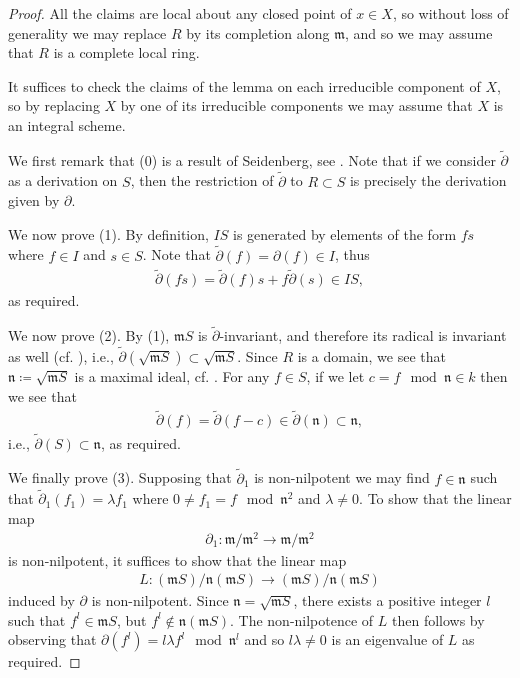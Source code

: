 \documentclass[12pt, a4paper]{amsart}
\theoremstyle{definition}
\theoremstyle{named}
\begin{document}
\begin{proof}
All the claims are local about any closed point of $x \in X$, so without loss of generality we may replace $R$ by its completion along $\mathfrak m$, and so we may assume that $R$ is a complete local ring.



It suffices to check the  claims of the lemma on each irreducible component of $X$, so by replacing $X$ by one of its irreducible components we may assume that $X$ is an integral scheme. 

We first remark that (0) is a result of Seidenberg, see \cite{MR188247}.  Note that 
if we consider $\tilde{\partial}$ as a derivation on $S$, then the restriction of $\tilde{\partial}$
to $R \subset S$
is precisely the derivation given by $\partial$.

We now prove (1). By definition, $IS$ is generated by elements of the form 
$fs$ where $f \in I$ and $s \in S$.  Note that $\tilde{\partial}(f) = \partial(f) \in I$, thus 
\begin{align*}\tilde{\partial}(fs) = \tilde{\partial}(f)s +f\tilde{\partial}(s) \in IS,\end{align*}
as required.


 We now prove (2).  By (1), $\mathfrak mS$ is $\tilde{\partial}$-invariant, and therefore its radical is invariant as well
 (cf. \cite[Lemma 1.8]{MR460303}), i.e.,   $\tilde{\partial}(\sqrt{\mathfrak mS}) \subset \sqrt{\mathfrak mS}$.  Since $R$ is a domain, we see
    that $\mathfrak n \coloneqq \sqrt{\mathfrak mS}$
    is a maximal ideal, cf. \cite[\href{https://stacks.math.columbia.edu/tag/0C37}{Tag 0C37}]{stacks-project}.   
    For any $f \in S$, if we let $c = f \mod \mathfrak n \in k$ then we see that \begin{align*}\tilde{\partial}(f) = \tilde{\partial}(f-c) \in \tilde{\partial}(\mathfrak n) \subset \mathfrak n, \end{align*}
    i.e., $\tilde{\partial}(S) \subset \mathfrak n$, as required.

    
We finally prove (3).  Supposing that $\tilde{\partial}_1$ is non-nilpotent we may find 
$f \in \mathfrak n$ such that $\tilde{\partial}_1(f_1) = \lambda f_1$
where $0 \neq f_1 = f \mod \mathfrak n^2$ and $\lambda \neq 0$.
To show that the linear map
\begin{align*}\partial_1\colon \mathfrak m/\mathfrak m^2 \to \mathfrak m/\mathfrak m^2 \end{align*}
is non-nilpotent, it suffices to show that 
 the linear map
 \begin{align*}L\colon (\mathfrak mS)/\mathfrak n(\mathfrak mS)\to (\mathfrak mS)/\mathfrak n(\mathfrak mS)\end{align*}
 induced by $\partial$ is non-nilpotent.
Since $\mathfrak n = \sqrt{\mathfrak mS}$, there exists a positive integer $l$ such that 
$f^l \in \mathfrak mS$, but $f^l \notin \mathfrak n(\mathfrak mS)$.  The non-nilpotence of $L$ then follows by observing that $\partial(f^l) = l\lambda f^l \mod \mathfrak n^l$ and so $l\lambda \neq 0$
is an eigenvalue of $L$ as required.
\end{proof}
\end{document}
